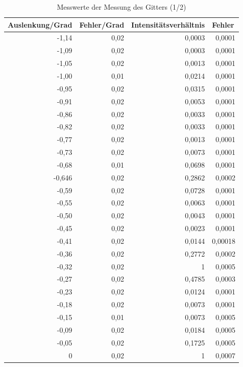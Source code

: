 \documentclass[12pt]{scrartcl}
\begin{document}
\begin{table}[H]
\caption{Messwerte der Messung des Gitters (1/2)}
\begin{center}
\begin{tabular}{|r|r|r|r|}
\hline
\multicolumn{1}{|l|}{Auslenkung/Grad} & \multicolumn{1}{l|}{Fehler/Grad} & \multicolumn{1}{l|}{Intensitätsverhältnis} & \multicolumn{1}{l|}{Fehler} \\ \hline
-1,14 & 0,02 & 0,0003 & 0,0001 \\ \hline
-1,09 & 0,02 & 0,0003 & 0,0001 \\ \hline
-1,05 & 0,02 & 0,0013 & 0,0001 \\ \hline
-1,00 & 0,01 & 0,0214 & 0,0001 \\ \hline
-0,95 & 0,02 & 0,0315 & 0,0001 \\ \hline
-0,91 & 0,02 & 0,0053 & 0,0001 \\ \hline
-0,86 & 0,02 & 0,0033 & 0,0001 \\ \hline
-0,82 & 0,02 & 0,0033 & 0,0001 \\ \hline
-0,77 & 0,02 & 0,0013 & 0,0001 \\ \hline
-0,73 & 0,02 & 0,0073 & 0,0001 \\ \hline
-0,68 & 0,01 & 0,0698 & 0,0001 \\ \hline
-0,646 & 0,02 & 0,2862 & 0,0002 \\ \hline
-0,59 & 0,02 & 0,0728 & 0,0001 \\ \hline
-0,55 & 0,02 & 0,0063 & 0,0001 \\ \hline
-0,50 & 0,02 & 0,0043 & 0,0001 \\ \hline
-0,45 & 0,02 & 0,0023 & 0,0001 \\ \hline
-0,41 & 0,02 & 0,0144 & 0,00018 \\ \hline
-0,36 & 0,02 & 0,2772 & 0,0002 \\ \hline
-0,32 & 0,02 & 1 & 0,0005 \\ \hline
-0,27 & 0,02 & 0,4785 & 0,0003 \\ \hline
-0,23 & 0,02 & 0,0124 & 0,0001 \\ \hline
-0,18 & 0,02 & 0,0073 & 0,0001 \\ \hline
-0,15 & 0,01 & 0,0073 & 0,0005 \\ \hline
-0,09 & 0,02 & 0,0184 & 0,0005 \\ \hline
-0,05 & 0,02 & 0,1725 & 0,0005 \\ \hline
0 & 0,02 & 1 & 0,0007 \\ \hline
\end{tabular}
\end{center}
\label{tab:a_4_e_a}
\end{table}
\end{document}
